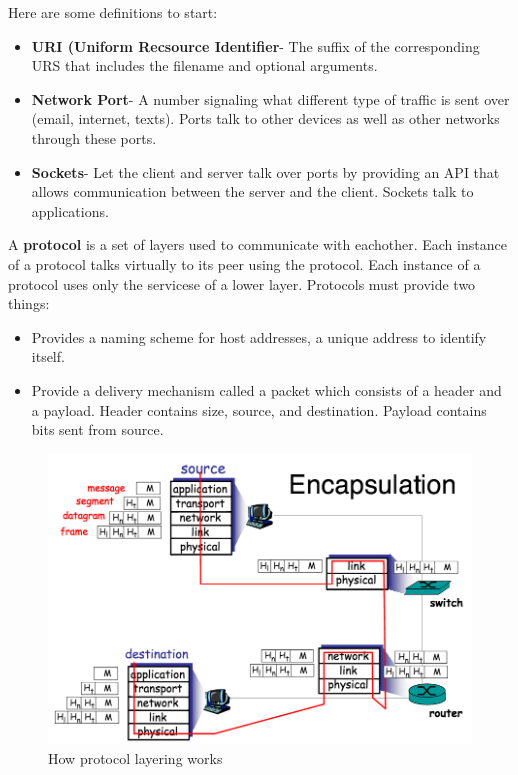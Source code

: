 \documentclass[15pt,idxtotoc,hyperref,openany]{labbook} %
\begin{document}








Here are some definitions to start:
\begin{itemize}
\item {\bf URI (Uniform Recsource Identifier}- The suffix of the corresponding URS that includes the filename and optional arguments.
\item {\bf Network Port}- A number signaling what different type of traffic is sent over (email, internet, texts).  Ports talk to other devices as well as other networks through these ports.  
\item {\bf Sockets}- Let the client and server talk over ports by providing an API that allows communication between the server and the client.  Sockets talk to applications.
\end{itemize}

A {\bf  protocol } is a set of layers used to communicate with eachother.  Each instance of a protocol talks virtually to its peer using the protocol.  Each instance of a protocol uses only the servicese of a lower layer.  Protocols must provide two things:
\begin{itemize}
\item Provides a naming scheme for host addresses, a unique address to identify itself.
\item Provide a delivery mechanism called a packet which consists of a header and a payload.  Header contains size, source, and destination.  Payload contains bits sent from source.
\end{itemize}


\begin{figure}[H] %
\begin{center}
\includegraphics[width=.8\linewidth]{encapsulation}
\end{center}
\caption{How protocol layering works}
\label{fig:example_figure}
\end{figure}
\end{document}
